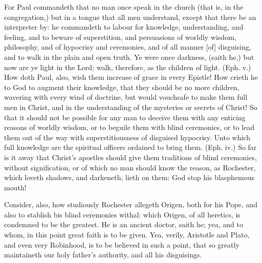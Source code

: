 For Paul commandeth that no man once speak in the 
church (that is, in the congregation,) but in a tongue that all 
men understand, except that there be an interpreter by: 
he commandeth to labour for knowledge, understanding,
and feeling, and to beware of superstition, and 
persuasions of worldly wisdom, philosophy, and of hypocrisy
and ceremonies, and of all manner [of] disguising, and 
to walk in the plain and open truth. Ye were once darkness, 
(saith he,) but now are ye light in the Lord; walk, therefore,
as the children of light. (Eph. v.) How doth Paul, 
also, wish them increase of grace in every Epistle! How 
crieth he to God to augment their knowledge, that they 
should be no more children, wavering with every wind of 
doctrine, but would vouchsafe to make them full men in 
Christ, and in the understanding of the mysteries or 
secrets of Christ! So that it should not be possible for 
any man to deceive them with any enticing reasons of 
worldly wisdom, or to beguile them with blind ceremonies,
or to lead them out of the way with superstitiousness
of disguised hypocrisy. Unto which full knowledge 
are the spiritual officers ordained to bring them. (Eph. iv.) 
So far is it away that Christ's apostles should give them 
traditions of blind ceremonies, without signification, or of 
which no man should know the reason, as Rochester, 
which loveth shadows, and darkeneth, lieth on them: God 
stop his blasphemous mouth! 

Consider, also, how studiously Rochester allegeth 
Origen, both for his Pope, and also to stablish bis blind 
ceremonies withal: which Origen, of all heretics, is condemned
to be the greatest. He is an ancient doctor, 
saith he; yea, and to whom, in this point great faith is to 
be given. Yea, verily, Aristotle and Plato, and even very 
Robinhood, is to be believed in such a point, that so 
greatly maintaineth our holy father's authority, and all his 
disguisings. 

